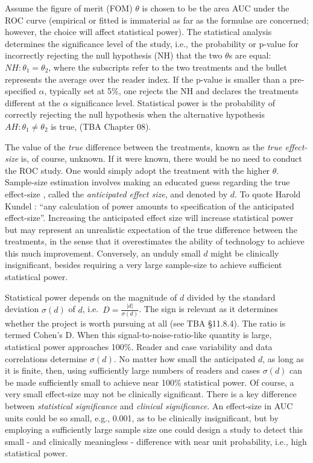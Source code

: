 \documentclass[
]{book}
\begin{document}
Assume the figure of merit (FOM) \(\theta\) is chosen to be the area AUC under the ROC curve (empirical or fitted is immaterial as far as the formulae are concerned; however, the choice will affect statistical power). The statistical analysis determines the significance level of the study, i.e., the probability or p-value for incorrectly rejecting the null hypothesis (NH) that the two \(\theta\)s are equal: \(NH: \theta_1 = \theta_2\), where the subscripts refer to the two treatments and the bullet represents the average over the reader index. If the p-value is smaller than a pre-specified \(\alpha\), typically set at 5\%, one rejects the NH and declares the treatments different at the \(\alpha\) significance level. Statistical power is the probability of correctly rejecting the null hypothesis when the alternative hypothesis \(AH: \theta_1 \neq \theta_2\) is true, (TBA Chapter 08).

The value of the \emph{true} difference between the treatments, known as the \emph{true effect-size} is, of course, unknown. If it were known, there would be no need to conduct the ROC study. One would simply adopt the treatment with the higher \(\theta\). Sample-size estimation involves making an educated guess regarding the true effect-size , called the \emph{anticipated effect size}, and denoted by \(d\). To quote Harold Kundel \citep{RN1383}: ``any calculation of power amounts to specification of the anticipated effect-size''. Increasing the anticipated effect size will increase statistical power but may represent an unrealistic expectation of the true difference between the treatments, in the sense that it overestimates the ability of technology to achieve this much improvement. Conversely, an unduly small \(d\) might be clinically insignificant, besides requiring a very large sample-size to achieve sufficient statistical power.

Statistical power depends on the magnitude of \(d\) divided by the standard deviation \(\sigma(d)\) of \(d\), i.e.~\(D=\frac{\left | d \right |}{\sigma (d)}\). The sign is relevant as it determines whether the project is worth pursuing at all (see TBA §11.8.4). The ratio is termed \citep{cohen1988statistical} Cohen's D. When this signal-to-noise-ratio-like quantity is large, statistical power approaches 100\%. Reader and case variability and data correlations determine \(\sigma(d)\). No matter how small the anticipated \(d\), as long as it is finite, then, using sufficiently large numbers of readers and cases \(\sigma(d)\) can be made sufficiently small to achieve near 100\% statistical power. Of course, a very small effect-size may not be clinically significant. There is a key difference between \emph{statistical significance} and \emph{clinical significance}. An effect-size in AUC units could be so small, e.g., 0.001, as to be clinically insignificant, but by employing a sufficiently large sample size one could design a study to detect this small - and clinically meaningless - difference with near unit probability, i.e., high statistical power.
\end{document}
